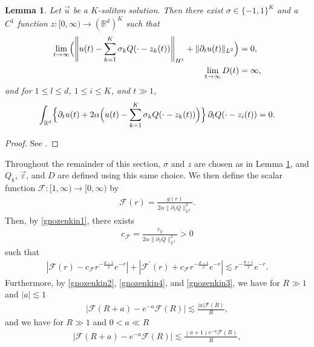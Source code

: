 \documentclass[10pt,a4paper]{amsart}
\newtheorem{lemma}[theorem]{Lemma}
\numberwithin{equation}{section}
\begin{document}
\begin{lemma}\label{modKsoli}
Let $\vec{u}$ be a $K$-soliton solution. Then there exist $\sigma\in\{-1,1\}^K$ and a $C^1$ function
$z:[0,\infty)\to (\mathbb{R}^d)^K$ such that
\begin{align}
\lim_{t\to\infty}\Bigl(\left\| u(t)-\sum_{k=1}^K \sigma_kQ(\cdot-z_k(t))\right\|_{H^1}
+\|{\partial}_tu(t)\|_{L^2}\Bigr)&=0,\label{modlim1yowa}
\\
\lim_{t\to\infty} D(t)&=\infty, \label{modlim2yowa}
\end{align}
and for $1\leq l\leq d$, $1\leq i\leq K$, and $t\gg 1$,
\begin{align}\label{modeqyowa}
\int_{\mathbb{R}^d} \Bigl\{ {\partial}_tu(t)+2\alpha\Bigl(u(t)-\sum_{k=1}^K \sigma_k Q(\cdot-z_k(t))\Bigr)\Bigr\}
\, {\partial}_lQ(\cdot-z_i(t))=0.
\end{align}
\end{lemma}
\begin{proof}
See \cite[Lemma 3.2]{I2}.
\end{proof}
Throughout the remainder of this section, $\sigma$ and $z$ are chosen as in Lemma \ref{modKsoli}, and $Q_k$, $\vec{\varepsilon}$, and $D$ are defined using this same choice. We then define the scalar function $\mathcal{F}:[1,\infty)\to [0,\infty)$ by
\begin{align}\label{Fdef}
\mathcal{F}(r)=\frac{g(r)}{2\alpha\|{\partial}_1Q\|_{L^2}^2}.
\end{align}
Then, by \eqref{gnozenkin1}, there exists
\begin{align*}
c_{\mathcal{F}}=\frac{c_g}{2\alpha\|{\partial}_1Q\|_{L^2}^2}>0
\end{align*}
such that 
\begin{align}\label{mathcalFhyouka1}
\left|\mathcal{F}(r)-c_{\mathcal{F}}r^{-\frac{d-1}{2}}e^{-r}\right|+\left|\mathcal{F}^{\prime}(r)+c_{\mathcal{F}}r^{-\frac{d-1}{2}}e^{-r}\right|
\lesssim r^{-\frac{d+1}{2}}e^{-r}.
\end{align}
Furthermore, by \eqref{gnozenkin2}, \eqref{gnozenkin4}, and \eqref{gnozenkin3}, we have for $R\gg 1$ and $|a|\lesssim 1$
\begin{align}\label{tukaeruF1}
\left|\mathcal{F}(R+a)-e^{-a}\mathcal{F}(R)\right|\lesssim \frac{|a|\mathcal{F}(R)}{R},
\end{align}
and we have for $R\gg 1$ and $0<a\ll R$
\begin{align}\label{tukaeruF3}
\left|\mathcal{F}(R+a)-e^{-a}\mathcal{F}(R)\right|\lesssim \frac{(a+1)e^{-a}\mathcal{F}(R)}{R},
\end{align}
\end{document}

